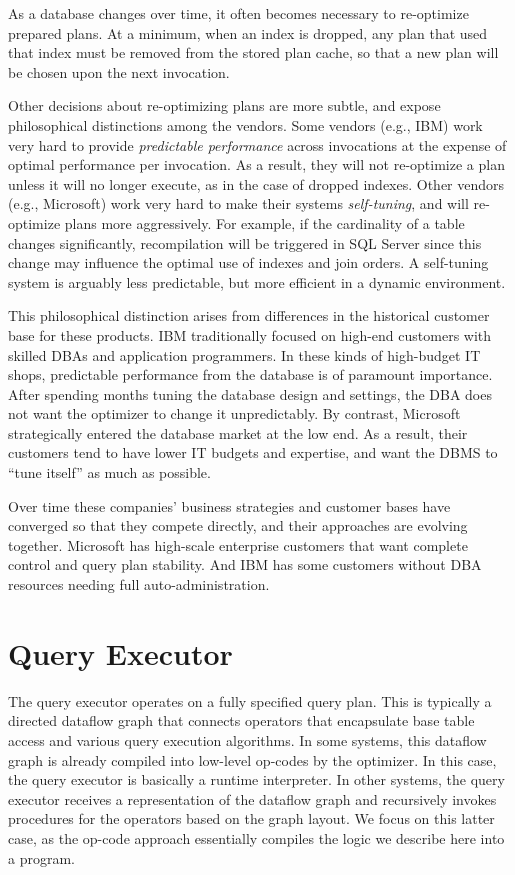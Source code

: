 \documentclass[a4paper,11pt,twoside,openright]{book}
\begin{document}
As a database changes over time, it often becomes necessary to
re-optimize prepared plans. At a minimum, when an index is dropped, any
plan that used that index must be removed from the stored plan cache, so
that a new plan will be chosen upon the next invocation.

Other decisions about re-optimizing plans are more subtle, and expose
philosophical distinctions among the vendors. Some vendors (e.g., IBM)
work very hard to provide \emph{predictable performance} across
invocations at the expense of optimal performance per invocation. As a
result, they will not re-optimize a plan unless it will no longer
execute, as in the case of dropped indexes. Other vendors (e.g.,
Microsoft) work very hard to make their systems \emph{self-tuning}, and
will re-optimize plans
more aggressively. For example, if the cardinality of a table changes
significantly, recompilation will be triggered in SQL Server since this
change may influence the optimal use of indexes and join orders. A
self-tuning system is arguably less predictable, but more efficient in a
dynamic environment.

This philosophical distinction arises from differences in the historical
customer base for these products. IBM traditionally focused on high-end
customers with skilled DBAs and application programmers. In these kinds
of high-budget IT shops, predictable performance from the database is of
paramount importance. After spending months tuning the database design
and settings, the DBA does not want the optimizer to change it
unpredictably. By contrast, Microsoft strategically entered the database
market at the low end. As a result, their customers tend to have lower
IT budgets and expertise, and want the DBMS to ``tune itself'' as much
as possible.

Over time these companies' business strategies and customer bases have
converged so that they compete directly, and their approaches are
evolving together. Microsoft has high-scale enterprise customers that
want complete control and query plan stability. And IBM has some
customers without DBA resources needing full auto-administration.

\hypertarget{query-executor}{%
\section{Query Executor}\label{query-executor}}

The query executor operates on a fully specified query plan. This is
typically a directed dataflow graph that connects operators that
encapsulate base table access and various query execution algorithms. In
some systems, this dataflow graph is already compiled into low-level
op-codes by the optimizer. In this case, the query executor is basically
a runtime interpreter. In other systems, the query executor receives a
representation of the dataflow graph and recursively invokes procedures
for the operators based on the graph layout. We focus on this latter
case, as the op-code approach essentially compiles the logic we describe
here into a program.
\end{document}
